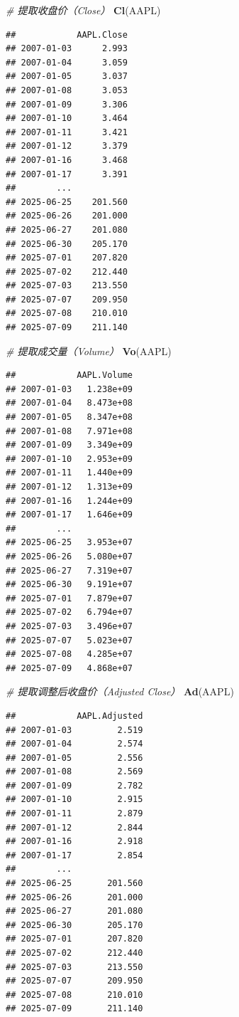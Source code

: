 \documentclass[]{ctexbook}
\newenvironment{Shaded}{\begin{snugshade}}{\end{snugshade}}
\newcommand{\CommentTok}[1]{\textcolor[rgb]{0.56,0.35,0.01}{\textit{#1}}}
\newcommand{\FunctionTok}[1]{\textcolor[rgb]{0.13,0.29,0.53}{\textbf{#1}}}
\newcommand{\NormalTok}[1]{#1}
\begin{document}
\begin{Shaded}
\begin{Highlighting}[]
\CommentTok{\# 提取收盘价（Close）}
\FunctionTok{Cl}\NormalTok{(AAPL)}
\end{Highlighting}
\end{Shaded}

\begin{verbatim}
##            AAPL.Close
## 2007-01-03      2.993
## 2007-01-04      3.059
## 2007-01-05      3.037
## 2007-01-08      3.053
## 2007-01-09      3.306
## 2007-01-10      3.464
## 2007-01-11      3.421
## 2007-01-12      3.379
## 2007-01-16      3.468
## 2007-01-17      3.391
##        ...           
## 2025-06-25    201.560
## 2025-06-26    201.000
## 2025-06-27    201.080
## 2025-06-30    205.170
## 2025-07-01    207.820
## 2025-07-02    212.440
## 2025-07-03    213.550
## 2025-07-07    209.950
## 2025-07-08    210.010
## 2025-07-09    211.140
\end{verbatim}

\begin{Shaded}
\begin{Highlighting}[]
\CommentTok{\# 提取成交量（Volume）}
\FunctionTok{Vo}\NormalTok{(AAPL)}
\end{Highlighting}
\end{Shaded}

\begin{verbatim}
##            AAPL.Volume
## 2007-01-03   1.238e+09
## 2007-01-04   8.473e+08
## 2007-01-05   8.347e+08
## 2007-01-08   7.971e+08
## 2007-01-09   3.349e+09
## 2007-01-10   2.953e+09
## 2007-01-11   1.440e+09
## 2007-01-12   1.313e+09
## 2007-01-16   1.244e+09
## 2007-01-17   1.646e+09
##        ...            
## 2025-06-25   3.953e+07
## 2025-06-26   5.080e+07
## 2025-06-27   7.319e+07
## 2025-06-30   9.191e+07
## 2025-07-01   7.879e+07
## 2025-07-02   6.794e+07
## 2025-07-03   3.496e+07
## 2025-07-07   5.023e+07
## 2025-07-08   4.285e+07
## 2025-07-09   4.868e+07
\end{verbatim}

\begin{Shaded}
\begin{Highlighting}[]
\CommentTok{\# 提取调整后收盘价（Adjusted Close）}
\FunctionTok{Ad}\NormalTok{(AAPL)}
\end{Highlighting}
\end{Shaded}

\begin{verbatim}
##            AAPL.Adjusted
## 2007-01-03         2.519
## 2007-01-04         2.574
## 2007-01-05         2.556
## 2007-01-08         2.569
## 2007-01-09         2.782
## 2007-01-10         2.915
## 2007-01-11         2.879
## 2007-01-12         2.844
## 2007-01-16         2.918
## 2007-01-17         2.854
##        ...              
## 2025-06-25       201.560
## 2025-06-26       201.000
## 2025-06-27       201.080
## 2025-06-30       205.170
## 2025-07-01       207.820
## 2025-07-02       212.440
## 2025-07-03       213.550
## 2025-07-07       209.950
## 2025-07-08       210.010
## 2025-07-09       211.140
\end{verbatim}
\end{document}
